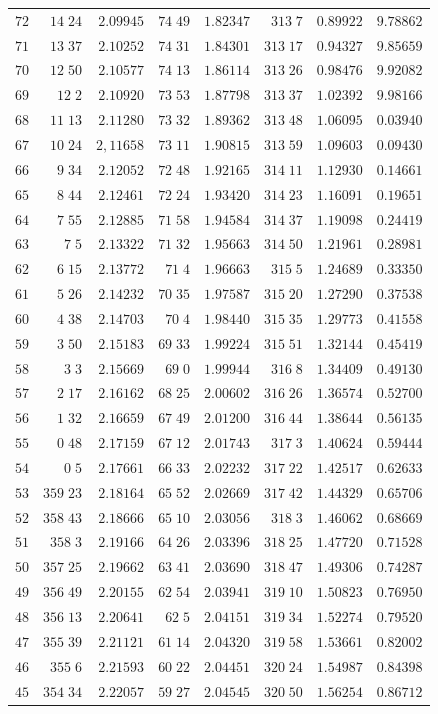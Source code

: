 \begin{center}
\begin{tabular}{r|r|r|r|r|r|r|r}
$72$&$14\;24$&$2.09945$&$74\;49$&$1.82347$&$313\;7$&$0.89922$&$9.78862$\\
$71$&$13\;37$&$2.10252$&$74\;31$&$1.84301$&$313\;17$&$0.94327$&$9.85659$\\[2pt]
$70$&$12\;50$&$2.10577$&$74\;13$&$1.86114$&$313\;26$&$0.98476$&$9.92082$\\
$69$&$12\;2$&$2.10920$&$73\;53$&$1.87798$&$313\;37$&$1.02392$&$9.98166$\\
$68$&$11\;13$&$2.11280$&$73\;32$&$1.89362$&$313\;48$&$1.06095$&$0.03940$\\
$67$&$10\;24$&$2,11658$&$73\;11$&$1.90815$&$313\;59$&$1.09603$&$0.09430$\\
$66$&$9\;34$&$2.12052$&$72\;48$&$1.92165$&$314\;11$&$1.12930$&$0.14661$\\[2pt]
$65$&$8\;44$&$2.12461$&$72\;24$&$1.93420$&$314\;23$&$1.16091$&$0.19651$\\
$64$&$7\;55$&$2.12885$&$71\;58$&$1.94584$&$314\;37$&$1.19098$&$0.24419$\\
$63$&$7\;5$&$2.13322$&$71\;32$&$1.95663$&$314\;50$&$1.21961$&$0.28981$\\
$62$&$6\;15$&$2.13772$&$71\;4$&$1.96663$&$315\;5$&$1.24689$&$0.33350$\\
$61$&$5\;26$&$2.14232$&$70\;35$&$1.97587$&$315\;20$&$1.27290$&$0.37538$\\[2pt]
$60$&$4\;38$&$2.14703$&$70\;4$&$1.98440$&$315\;35$&$1.29773$&$0.41558$\\
$59$&$3\;50$&$2.15183$&$69\;33$&$1.99224$&$315\;51$&$1.32144$&$0.45419$\\
$58$&$3\;3$&$2.15669$&$69\;0$&$1.99944$&$316\;8$&$1.34409$&$0.49130$\\
$57$&$2\;17$&$2.16162$&$68\;25$&$2.00602$&$316\;26$&$1.36574$&$0.52700$\\
$56$&$1\;32$&$2.16659$&$67\;49$&$2.01200$&$316\;44$&$1.38644$&$0.56135$\\[2pt]
$55$&$0\;48$&$2.17159$&$67\;12$&$2.01743$&$317\;3$&$1.40624$&$0.59444$\\
$54$&$0\;5$&$2.17661$&$66\;33$&$2.02232$&$317\;22$&$1.42517$&$0.62633$\\
$53$&$359\;23$&$2.18164$&$65\;52$&$2.02669$&$317\;42$&$1.44329$&$0.65706$\\
$52$&$358\;43$&$2.18666$&$65\;10$&$2.03056$&$318\;3$&$1.46062$&$0.68669$\\
$51$&$358\;3$&$2.19166$&$64\;26$&$2.03396$&$318\;25$&$1.47720$&$0.71528$\\[2pt]
$50$&$357\;25$&$2.19662$&$63\;41$&$2.03690$&$318\;47$&$1.49306$&$0.74287$\\
$49$&$356\;49$&$2.20155$&$62\;54$&$2.03941$&$319\;10$&$1.50823$&$0.76950$\\
$48$&$356\;13$&$2.20641$&$62\;5$&$2.04151$&$319\;34$&$1.52274$&$0.79520$\\
$47$&$355\;39$&$2.21121$&$61\;14$&$2.04320$&$319\;58$&$1.53661$&$0.82002$\\
$46$&$355\;6$&$2.21593$&$60\;22$&$2.04451$&$320\;24$&$1.54987$&$0.84398$\\[2pt]
$45$&$354\;34$&$2.22057$&$59\;27$&$2.04545$&$320\;50$&$1.56254$&$0.86712$\\
\hline
\end{tabular}
\end{center}
